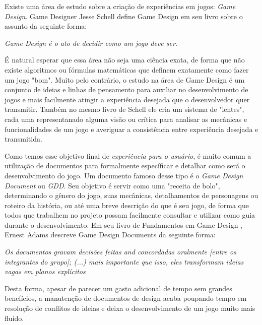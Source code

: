   Existe uma área de estudo sobre a criação de experiências em jogos: \textit{Game Design}. Game Designer Jesse Schell define Game Design em seu livro sobre o assunto \cite{jessegamedesign} da seguinte forma:

  \begin{displayquote}
    \textit{Game Design é o ato de decidir como um jogo deve ser.}
  \end{displayquote}

   É natural esperar que essa área não seja uma ciência exata, de forma que não existe algoritmos ou fórmulas matemáticas que definem exatamente como fazer um jogo "bom". Muito pelo contrário, o estudo na área de Game Design é um conjunto de ideias e linhas de pensamento para auxiliar no desenvolvimento de jogos e mais facilmente atingir a experiência desejada que o desenvolvedor quer transmitir. Também no mesmo livro de Schell \cite{jessegamedesign} ele cria um sistema de "lentes", cada uma representanado alguma visão ou crítica para analisar as mecânicas e funcionalidades de um jogo e averiguar a consistência entre experiência desejada e transmitida.

  Como temos esse objetivo final de \textit{experiência para o usuário}, é muito comum a utilização de documentos para formalmente específicar e detalhar como será o desenvolvimento do jogo. Um documento famoso desse tipo é o \textit{Game Design Document} ou \textit{GDD}. Seu objetivo é servir como uma "receita de bolo", determinando o gênero do jogo, suas mecânicas, detalhamentos de personagens ou roteiro da história, ou até uma breve descrição do que é seu jogo, de forma que todos que trabalhem no projeto possam facilmente consultar e utilizar como guia durante o desenvolvimento. Em seu livro de Fundamentos em Game Design \cite{ernestgamedesign}, Ernest Adams descreve Game Design Documents da seguinte forma:

  \begin{displayquote}
    \textit{Os documentos gravam decisões feitas and concordadas oralmente [entre os integrantes do grupo]; (...) mais importante que isso, eles transformam ideias vagas em planos explícitos}
  \end{displayquote}

  Desta forma, apesar de parecer um gasto adicional de tempo sem grandes benefícios, a manutenção de documentos de design acaba poupando tempo em resolução de conflitos de ideias e deixa o desenvolvimento de um jogo muito mais fluído.\\

